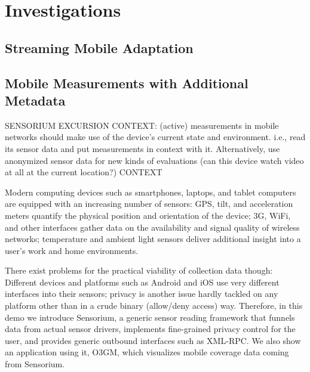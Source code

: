 \section{Investigations}


\subsection{Streaming Mobile Adaptation}



\subsection{Mobile Measurements with Additional Metadata}
\label{c5:sensorium}

SENSORIUM EXCURSION
CONTEXT: (active) measurements in mobile networks should make use of the device's current state and environment. i.e., read its sensor data and put measurements in context with it. Alternatively, use anonymized sensor data for new kinds of evaluations (can this device watch video at all at the current location?)
CONTEXT

Modern computing devices such as smartphones, laptops, and tablet computers are equipped with an increasing number of sensors: \gls{GPS}, tilt, and acceleration meters quantify the physical position and orientation of the device; 3G, WiFi, and other  interfaces gather data on the availability and signal quality of wireless networks; temperature and ambient light sensors deliver additional insight into a user's work and home environments.

There exist problems for the practical viability of collection data though: Different devices and platforms such as Android and iOS use very different interfaces into their sensors; privacy is another issue hardly tackled on any platform other than in a crude binary (allow/deny access) way. Therefore, in this demo we introduce Sensorium, a generic sensor reading framework that funnels data from actual sensor drivers, implements fine-grained privacy control for the user, and provides generic outbound interfaces such as \acrshort{XML}-\acrshort{RPC}. We also show an application using it, O3GM, which visualizes mobile coverage data coming from Sensorium.

